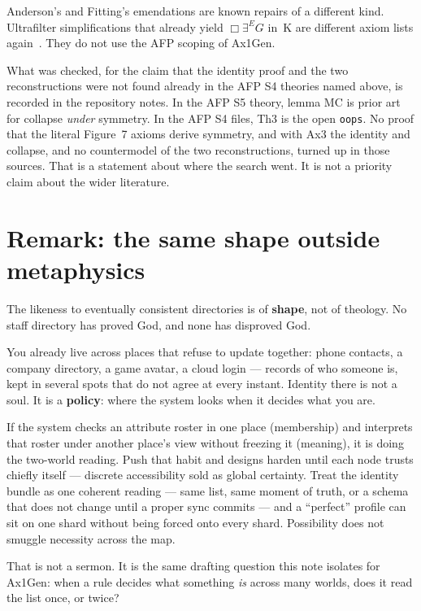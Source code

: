 \documentclass[11pt]{article}
\begin{document}
Anderson's and Fitting's emendations are known repairs of a different kind. Ultrafilter
simplifications that already yield \(\Box\exists^E G\) in~K are different axiom lists
again~\cite{Benz2021AFP,Benz2026arxiv}. They do not use the AFP scoping of Ax1Gen.

What was checked, for the claim that the identity proof and the two reconstructions were
not found already in the AFP S4 theories named above, is recorded in the repository notes.
In the AFP S5 theory, lemma MC is prior art for collapse \emph{under} symmetry. In the AFP
S4 files, Th3 is the open \texttt{oops}. No proof that the literal Figure~7 axioms
derive symmetry, and with Ax3 the identity and collapse, and no countermodel of the two
reconstructions, turned up in those sources. That is a statement about where the search
went. It is not a priority claim about the wider literature.

\section{Remark: the same shape outside metaphysics}
\label{sec:directories}

The likeness to eventually consistent directories is of \textbf{shape}, not of theology.
No staff directory has proved God, and none has disproved God.

You already live across places that refuse to update together: phone contacts, a company
directory, a game avatar, a cloud login --- records of who someone is, kept in several spots
that do not agree at every instant. Identity there is not a soul. It is a \textbf{policy}:
where the system looks when it decides what you are.

If the system checks an attribute roster in one place (membership) and interprets that
roster under another place's view without freezing it (meaning), it is doing the two-world
reading. Push that habit and designs harden until each node trusts chiefly itself ---
discrete accessibility sold as global certainty. Treat the identity bundle as one coherent
reading --- same list, same moment of truth, or a schema that does not change until a proper
sync commits --- and a ``perfect'' profile can sit on one shard without being forced onto
every shard. Possibility does not smuggle necessity across the map.

That is not a sermon. It is the same drafting question this note isolates for Ax1Gen: when
a rule decides what something \emph{is} across many worlds, does it read the list once, or
twice?
\end{document}
